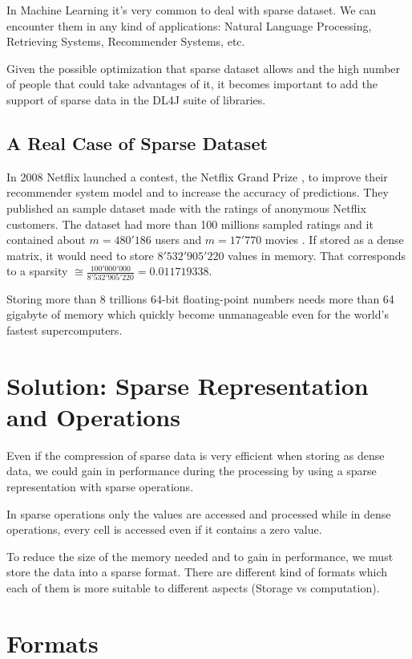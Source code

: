 In Machine Learning it's very common to deal with sparse dataset. We can encounter them in any kind of applications: Natural Language Processing, Retrieving Systems, Recommender Systems, etc.

Given the possible optimization that sparse dataset allows and the high number of people that could take advantages of it, it becomes important to add the support of sparse data in the DL4J suite of libraries. 
\subsection{A Real Case of Sparse Dataset}
In 2008 Netflix launched a contest, the Netflix Grand Prize \cite{netflixgrandprize}, to improve their recommender system model and to increase the accuracy of predictions. They published an sample dataset made with the ratings of anonymous Netflix customers. The dataset had more than 100 millions sampled ratings and it contained about $m=480'186$ users and $m=17'770$ movies \cite{Koren091the}. If stored as a dense matrix, it would need to store $8'532'905'220$ values in memory. That corresponds to a sparsity $\cong \frac{100'000'000}{8'532'905'220} = 0.011719338$.

Storing more than 8 trillions 64-bit floating-point numbers needs more than 64 gigabyte of memory which quickly become unmanageable even for the world's fastest supercomputers. 

\section{Solution: Sparse Representation and Operations}
Even if the compression of sparse data is very efficient when storing as dense data, we could gain in performance during the processing by using a sparse representation with sparse operations. 

In sparse operations only the values are accessed and processed while in dense operations, every cell is accessed even if it contains a zero value.

To reduce the size of the memory needed and to gain in performance, we must store the data into a sparse format. There are different kind of formats which each of them is more suitable to different aspects (Storage vs computation).



\section{Formats}

